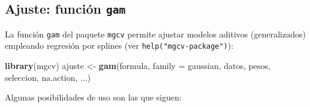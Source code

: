 \documentclass[]{book}
\newenvironment{Shaded}{\begin{snugshade}}{\end{snugshade}}
\newcommand{\KeywordTok}[1]{\textcolor[rgb]{0.13,0.29,0.53}{\textbf{#1}}}
\newcommand{\DataTypeTok}[1]{\textcolor[rgb]{0.13,0.29,0.53}{#1}}
\newcommand{\StringTok}[1]{\textcolor[rgb]{0.31,0.60,0.02}{#1}}
\newcommand{\NormalTok}[1]{#1}
\begin{document}
\subsection{\texorpdfstring{Ajuste: función
\texttt{gam}}{Ajuste: función gam}}\label{ajuste-funcion-gam}

La función \texttt{gam} del paquete \texttt{mgcv} permite ajustar
modelos aditivos (generalizados) empleando regresión por splines (ver
\texttt{help("mgcv-package")}):

\begin{Shaded}
\begin{Highlighting}[]
\KeywordTok{library}\NormalTok{(mgcv)}
\NormalTok{ajuste <-}\StringTok{ }\KeywordTok{gam}\NormalTok{(formula, }\DataTypeTok{family =}\NormalTok{ gaussian, datos, pesos, seleccion, na.action, ...)}
\end{Highlighting}
\end{Shaded}

Algunas posibilidades de uso son las que siguen:
\end{document}
